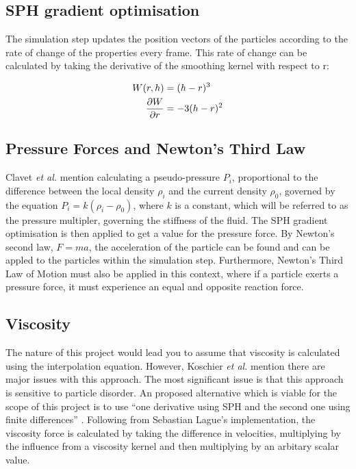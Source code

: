 \documentclass[write-up.tex]{subfiles}
\begin{document}
\subsection{SPH gradient optimisation}

The simulation step updates the position vectors of the particles according to the rate of change of the properties every frame. This rate of change can be calculated by taking the derivative of the smoothing kernel with respect to r:

\begin{align*}
W(r, h) &= (h-r)^3 \\
\pdv{W}{r} &= -3(h-r)^2
\end{align*}

\subsection{Pressure Forces and Newton's Third Law}

Clavet \textit{et al.} \cite{clavet} mention calculating a pseudo-pressure $P_i$, proportional to the difference between the local density $\rho_i$ and the current density $\rho_0$, governed by the equation $P_i = k(\rho_i - \rho_0)$, where $k$ is a constant, which will be referred to as the pressure multipler, governing the stiffness of the fluid. The SPH gradient optimisation is then applied to get a value for the pressure force. By Newton's second law, $F = ma$, the acceleration of the particle can be found and can be appled to the particles within the simulation step. Furthermore, Newton's Third Law of Motion must also be applied in this context, where if a particle exerts a pressure force, it must experience an equal and opposite reaction force.

\subsection{Viscosity}
The nature of this project would lead you to assume that viscosity is calculated using the interpolation equation. However, Koschier \textit{et al.}\cite{koschier} mention there are major issues with this approach. The most significant issue is that this approach is sensitive to particle disorder. An proposed alternative which is viable for the scope of this project is to use ``one derivative using SPH and the second one using finite differences'' \cite{koschier}. Following from Sebastian Lague's implementation, the viscosity force is calculated by taking the difference in velocities, multiplying by the influence from a viscosity kernel and then multiplying by an arbitary scalar value.
\end{document}
